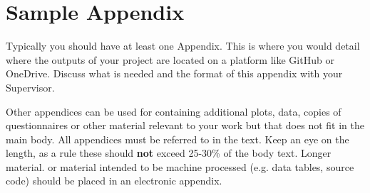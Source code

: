 \chapter{Sample Appendix}

Typically you should have at least one Appendix. This is where you would detail where the outputs of your project are located on a platform like GitHub or OneDrive. Discuss what is needed and the format of this appendix with your Supervisor.

Other appendices can be used for containing additional plots, data, copies of questionnaires or other material relevant to your work but that does not fit in the main body. All appendices must be referred to in the text.  Keep an eye on the length, as a rule these should \textbf{not} exceed 25-30\% of the body text. Longer material. or material intended to be machine processed (e.g. data tables, source code) should be placed in an electronic appendix.